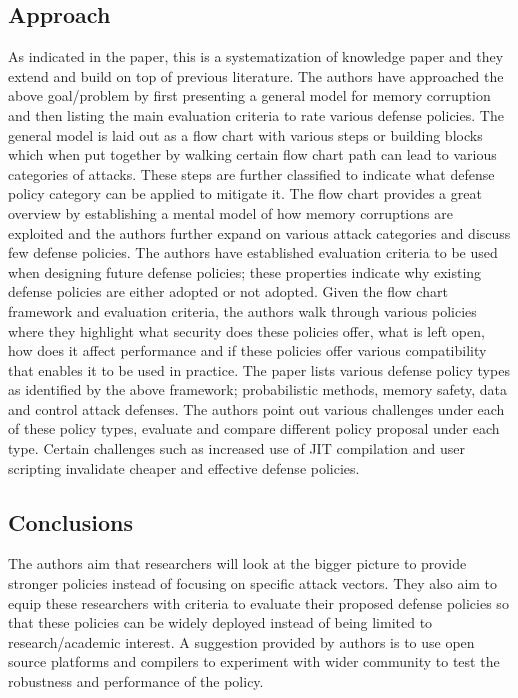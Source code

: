 \documentclass[12pt]{article}
\begin{document}
    \subsection*{Approach}
    As indicated in the paper, this is a systematization of knowledge paper and they extend and build on top of previous literature. The authors have approached the above goal/problem by first presenting a general model for memory corruption and then listing the main evaluation criteria to rate various defense policies. The general model is laid out as a flow chart with various steps or building blocks which when put together by walking certain flow chart path can lead to various categories of attacks. These steps are further classified to indicate what defense policy category can be applied to mitigate it. The flow chart provides a great overview by establishing a mental model of how memory corruptions are exploited and the authors further expand on various attack categories and discuss few defense policies. The authors have established evaluation criteria to be used when designing future defense policies; these properties indicate why existing defense policies are either adopted or not adopted. Given the flow chart framework and evaluation criteria, the authors walk through various policies where they highlight what security does these policies offer, what is left open, how does it affect performance and if these policies offer various compatibility that enables it to be used in practice. The paper lists various defense policy types as identified by the above framework; probabilistic methods, memory safety, data and control attack defenses. The authors point out various challenges under each of these policy types, evaluate and compare different policy proposal under each type. Certain challenges such as increased use of JIT compilation and user scripting invalidate cheaper and effective defense policies.
    
    \subsection*{Conclusions}
    The authors aim that researchers will look at the bigger picture to provide stronger policies instead of focusing on specific attack vectors. They also aim to equip these researchers with criteria to evaluate their proposed defense policies so that these policies can be widely deployed instead of being limited to research/academic interest. A suggestion provided by authors is to use open source platforms and compilers to experiment with wider community to test the robustness and performance of the policy.
\end{document}
